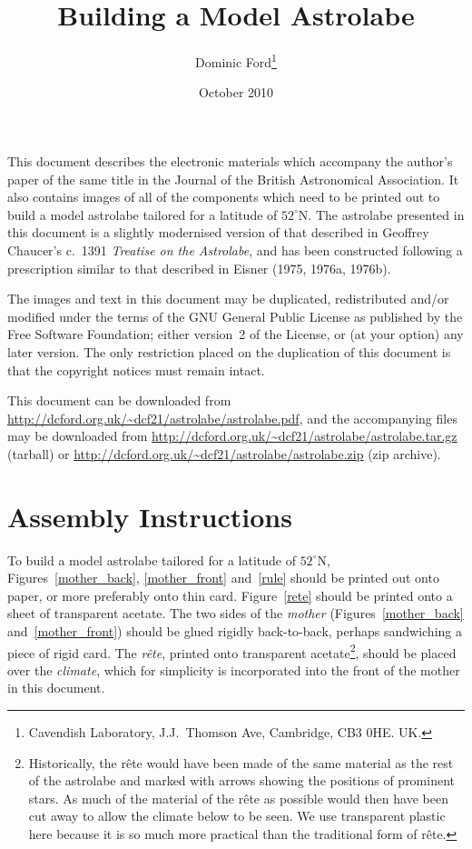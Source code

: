 \documentclass[a4paper,onecolumn,10pt]{article}
\title{Building a Model Astrolabe}
\author{Dominic Ford\footnote{Cavendish Laboratory, J.J.\ Thomson Ave, Cambridge, CB3 0HE. UK.}}
\date{October 2010}
\begin{document}
\maketitle
\setcounter{footnote}{1}

This document describes the electronic materials which accompany the author's
paper of the same title in the Journal of the British Astronomical Association.
It also contains images of all of the components which need to be printed out
to build a model astrolabe tailored for a latitude of $52^\circ$N. The
astrolabe presented in this document is a slightly modernised version of that
described in Geoffrey Chaucer's c.\ 1391 {\it Treatise on the Astrolabe}, and
has been constructed following a prescription similar to that described in
Eisner (1975, 1976a, 1976b).

The images and text in this document may be duplicated, redistributed and/or
modified under the terms of the GNU General Public License as published by the
Free Software Foundation; either version~2 of the License, or (at your option)
any later version. The only restriction placed on the duplication of this
document is that the copyright notices must remain intact.

This document can be downloaded from
\url{http://dcford.org.uk/~dcf21/astrolabe/astrolabe.pdf}, and the accompanying
files may be downloaded from
\url{http://dcford.org.uk/~dcf21/astrolabe/astrolabe.tar.gz} (tarball) or
\url{http://dcford.org.uk/~dcf21/astrolabe/astrolabe.zip} (zip archive).

\section*{Assembly Instructions}

To build a model astrolabe tailored for a latitude of $52^\circ$N,
Figures~\ref{mother_back}, \ref{mother_front} and~\ref{rule} should be printed
out onto paper, or more preferably onto thin card.  Figure~\ref{rete} should be
printed onto a sheet of transparent acetate.  The two sides of the {\it mother}
(Figures~\ref{mother_back} and~\ref{mother_front}) should be glued rigidly
back-to-back, perhaps sandwiching a piece of rigid card. The {\it r\^ete},
printed onto transparent acetate\footnote{Historically, the r\^ete would have
been made of the same material as the rest of the astrolabe and marked with
arrows showing the positions of prominent stars. As much of the material of the
r\^ete as possible would then have been cut away to allow the climate below to
be seen. We use transparent plastic here because it is so much more practical
than the traditional form of r\^ete.}, should be placed over the {\it climate},
which for simplicity is incorporated into the front of the mother in this
document.
\end{document}
